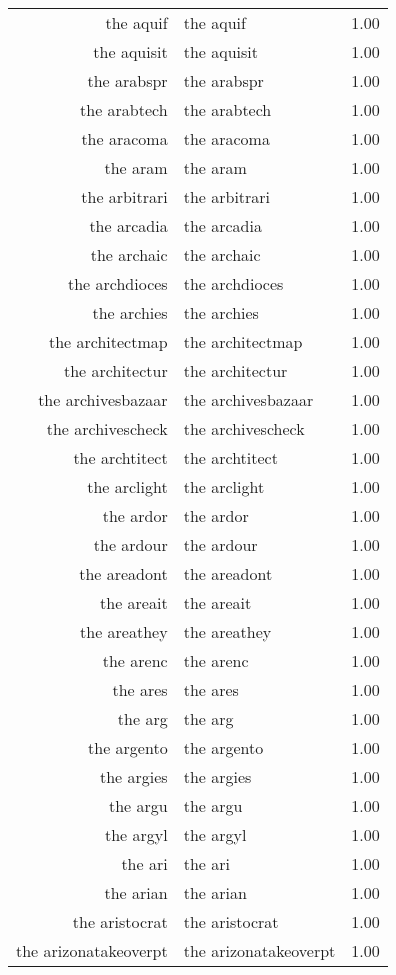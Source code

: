 \begin{table}[ht]
\begin{tabular}{rlr}
  the aquif & the aquif & 1.00 \\ 
  the aquisit & the aquisit & 1.00 \\ 
  the arabspr & the arabspr & 1.00 \\ 
  the arabtech & the arabtech & 1.00 \\ 
  the aracoma & the aracoma & 1.00 \\ 
  the aram & the aram & 1.00 \\ 
  the arbitrari & the arbitrari & 1.00 \\ 
  the arcadia & the arcadia & 1.00 \\ 
  the archaic & the archaic & 1.00 \\ 
  the archdioces & the archdioces & 1.00 \\ 
  the archies & the archies & 1.00 \\ 
  the architectmap & the architectmap & 1.00 \\ 
  the architectur & the architectur & 1.00 \\ 
  the archivesbazaar & the archivesbazaar & 1.00 \\ 
  the archivescheck & the archivescheck & 1.00 \\ 
  the archtitect & the archtitect & 1.00 \\ 
  the arclight & the arclight & 1.00 \\ 
  the ardor & the ardor & 1.00 \\ 
  the ardour & the ardour & 1.00 \\ 
  the areadont & the areadont & 1.00 \\ 
  the areait & the areait & 1.00 \\ 
  the areathey & the areathey & 1.00 \\ 
  the arenc & the arenc & 1.00 \\ 
  the ares & the ares & 1.00 \\ 
  the arg & the arg & 1.00 \\ 
  the argento & the argento & 1.00 \\ 
  the argies & the argies & 1.00 \\ 
  the argu & the argu & 1.00 \\ 
  the argyl & the argyl & 1.00 \\ 
  the ari & the ari & 1.00 \\ 
  the arian & the arian & 1.00 \\ 
  the aristocrat & the aristocrat & 1.00 \\ 
  the arizonatakeoverpt & the arizonatakeoverpt & 1.00 \\ 

\end{tabular}
\end{table}
